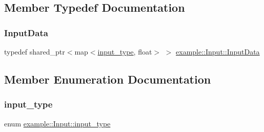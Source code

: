 \subsection{Member Typedef Documentation}
\mbox{\label{classexample_1_1_input_a574fd91f61d018474389e778c31e0da2}} 
\subsubsection{\texorpdfstring{Input\+Data}{InputData}}
{\footnotesize\ttfamily typedef shared\+\_\+ptr$<$map$<$\mbox{\hyperlink{classexample_1_1_input_a315efe66cfd6b49cbe0f46ab46ece59f}{input\+\_\+type}}, float$>$ $>$ \mbox{\hyperlink{classexample_1_1_input_a574fd91f61d018474389e778c31e0da2}{example\+::\+Input\+::\+Input\+Data}}}



\subsection{Member Enumeration Documentation}
\mbox{\label{classexample_1_1_input_a315efe66cfd6b49cbe0f46ab46ece59f}} 
\subsubsection{\texorpdfstring{input\+\_\+type}{input\_type}}
{\footnotesize\ttfamily enum \mbox{\hyperlink{classexample_1_1_input_a315efe66cfd6b49cbe0f46ab46ece59f}{example\+::\+Input\+::input\+\_\+type}}}

